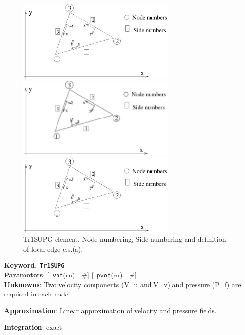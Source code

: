 \documentclass[a4paper]{article}
\newcommand{\descitem}[1]{{\noindent \bf #1}:}
\newcommand{\elemkeyword}[1]{\descitem{Keyword}~{\bf \texttt{#1}}}
\newcommand{\elemparam}[2]{{{\texttt{#1}\tiny (#2)}~~\#}}
\newcommand{\optelemparam}[2]{{[~\elemparam{#1}{#2}]}}
\begin{document}
\begin{figure}[tb]
\begin{htmlonly}
  \centerline{\includegraphics[width=0.7\textwidth]{trplanstrss.eps}}
\end{htmlonly}
\ifpdf
 \centerline{\includegraphics[width=0.7\textwidth]{trplanstrss.pdf}}
\else
 \centerline{\includegraphics[width=0.7\textwidth]{trplanstrss.eps}}
\fi
\caption{Tr1SUPG element. Node numbering, Side numbering and
definition of local edge c.s.(a).}
\label{Tr1SUPG2fig}
\end{figure}

\elemkeyword{Tr1SUPG}\\
\descitem{Parameters} \optelemparam{vof}{rn}
\optelemparam{pvof}{rn}\\
\descitem{Unknowns}
Two velocity components (V\_u and V\_v) and pressure (P\_f) are required in each node.

\descitem{Approximation} Linear approximation of velocity and pressure
fields.

\descitem{Integration}
exact
\end{document}

